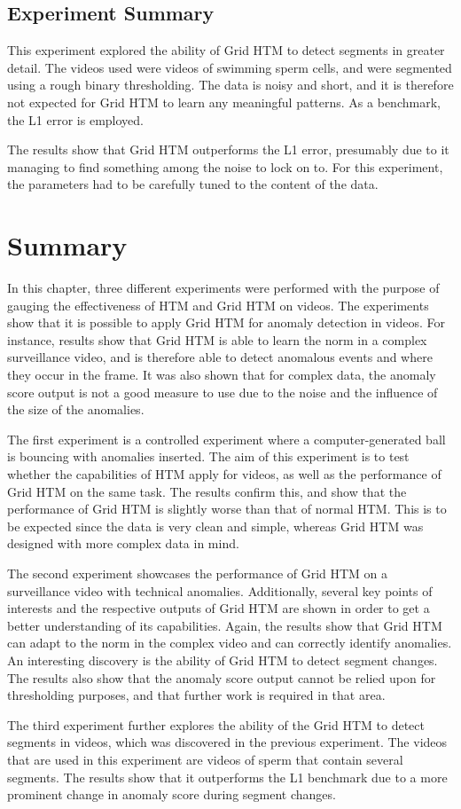 \subsection{Experiment Summary}
This experiment explored the ability of Grid HTM to detect segments in greater detail. The videos used were videos of swimming sperm cells, and were segmented using a rough binary thresholding. The data is noisy and short, and it is therefore not expected for Grid HTM to learn any meaningful patterns. As a benchmark, the L1 error is employed.
\par
The results show that Grid HTM outperforms the L1 error, presumably due to it managing to find something among the noise to lock on to. For this experiment, the parameters had to be carefully tuned to the content of the data.
\clearpage
\section{Summary}
In this chapter, three different experiments were performed with the purpose of gauging the effectiveness of HTM and Grid HTM on videos. The experiments show that it is possible to apply Grid HTM for anomaly detection in videos. For instance, results show that Grid HTM is able to learn the norm in a complex surveillance video, and is therefore able to detect anomalous events and where they occur in the frame. It was also shown that for complex data, the anomaly score output is not a good measure to use due to the noise and the influence of the size of the anomalies.
\par
The first experiment is a controlled experiment where a computer-generated ball is bouncing with anomalies inserted. The aim of this experiment is to test whether the capabilities of HTM apply for videos, as well as the performance of Grid HTM on the same task. The results confirm this, and show that the performance of Grid HTM is slightly worse than that of normal HTM. This is to be expected since the data is very clean and simple, whereas Grid HTM was designed with more complex data in mind.
\par
The second experiment showcases the performance of Grid HTM on a surveillance video with technical anomalies. Additionally, several key points of interests and the respective outputs of Grid HTM are shown in order to get a better understanding of its capabilities. Again, the results show that Grid HTM can adapt to the norm in the complex video and can correctly identify anomalies. An interesting discovery is the ability of Grid HTM to detect segment changes. The results also show that the anomaly score output cannot be relied upon for thresholding purposes, and that further work is required in that area.
\par
The third experiment further explores the ability of the Grid HTM to detect segments in videos, which was discovered in the previous experiment. The videos that are used in this experiment are videos of sperm that contain several segments. The results show that it outperforms the L1 benchmark due to a more prominent change in anomaly score during segment changes.

